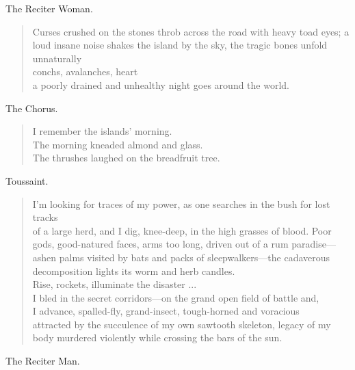 \documentclass[letterpaper,article,12pt,oneside,notitlepage]{memoir}
\begin{document}
\begin{center}The Reciter Woman.\end{center}

\begin{verse}
\indent Curses crushed on the stones throb across the road with heavy toad eyes; a loud insane noise shakes the island by the sky, the tragic bones unfold unnaturally \\
conchs, avalanches, heart \\
a poorly drained and unhealthy night goes around the world. \\
\end{verse}

\begin{center}The Chorus.\end{center}

\begin{verse}
\hspace{1cm} I remember the islands' morning. \\
The morning kneaded almond and glass. \\
The thrushes laughed on the breadfruit tree. \\
\end{verse}

\begin{center}Toussaint.\end{center}

\begin{verse}
\indent I'm looking for traces of my power, as one searches in the bush for lost tracks \\
of a large herd, and I dig, knee-deep, in the high grasses of blood. Poor gods, good-natured faces, arms too long, driven out of a rum paradise---ashen palms visited by bats and packs of sleepwalkers---the cadaverous decomposition lights its worm and herb candles. \\
Rise, rockets, illuminate the disaster ... \\
I bled in the secret corridors---on the grand open field of battle and, \\
I advance, spalled-fly, grand-insect, tough-horned and voracious \\
attracted by the succulence of my own sawtooth skeleton, legacy of my body murdered violently while crossing the bars of the sun. \\
\end{verse}

\begin{center}The Reciter Man.\end{center}
\end{document}
